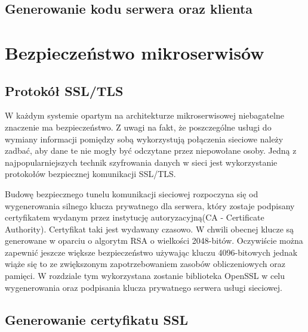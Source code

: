 \subsection{Generowanie kodu serwera oraz klienta}
\par
\section{Bezpieczeństwo mikroserwisów}
\subsection{Protokół SSL/TLS}
\par W każdym systemie opartym na architekturze mikroserwisowej niebagatelne znaczenie ma bezpieczeństwo. Z uwagi na fakt, że poszczególne usługi do wymiany informacji pomiędzy sobą wykorzystują połączenia sieciowe należy zadbać, aby dane te nie mogły być odczytane przez niepowołane osoby. Jedną z najpopularniejszych technik szyfrowania danych w sieci jest wykorzystanie protokołów bezpiecznej komunikacji SSL/TLS.
\par Budowę bezpiecznego tunelu komunikacji sieciowej rozpoczyna się od wygenerowania silnego klucza prywatnego dla serwera, który zostaje podpisany certyfikatem wydanym przez instytucję autoryzacyjną(CA - Certificate Authority). Certyfikat taki jest wydawany czasowo. W chwili obecnej klucze są generowane w oparciu o algorytm RSA o wielkości 2048-bitów. Oczywiście można zapewnić jeszcze większe bezpieczeństwo używając kluczu 4096-bitowych jednak wiąże się to ze zwiększonym zapotrzebowaniem zasobów obliczeniowych oraz pamięci. W rozdziale tym wykorzystana zostanie biblioteka OpenSSL w celu wygenerowania oraz podpisania klucza prywatnego serwera usługi sieciowej.
\subsection{Generowanie certyfikatu SSL}

